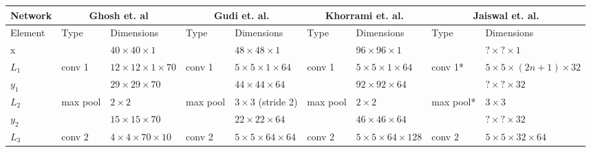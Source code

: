 \documentclass[9pt]{article} \usepackage{amsmath, amsthm, amssymb}
\begin{document}
\begin{table}[h!]
\centering
{\footnotesize
\begin{tabular}{|lllllllll|}
\hline
Network                      & \multicolumn{2}{c}{Ghosh et. al\cite{Ghosh2015}}                         & \multicolumn{2}{c}{Gudi et. al.\cite{Gudi2015}}                            & \multicolumn{2}{c}{Khorrami et. al.\cite{dodeeplearn}}                          & \multicolumn{2}{c|}{Jaiswal et. al.\cite{Jaiswal2016}}   \\ \hline
\multicolumn{1}{|l|}{Element} & Type     & \multicolumn{1}{l|}{Dimensions}                    & Type     & \multicolumn{1}{l|}{Dimensions}                      & Type          & \multicolumn{1}{l|}{Dimensions}                  & Type      & Dimensions                     \\ \hline
\multicolumn{1}{|l|}{x}       &          & \multicolumn{1}{l|}{$40\times40\times1$}           &          & \multicolumn{1}{l|}{$48\times 48\times1$}            &               & \multicolumn{1}{l|}{$96\times96\times1$}         &           & $?\times?\times1$              \\ \hline
\multicolumn{1}{|l|}{$L_1$}   & conv 1   & \multicolumn{1}{l|}{$12\times 12\times1\times 70$} & conv 1   & \multicolumn{1}{l|}{$5\times 5\times1\times64$}      & conv 1        & \multicolumn{1}{l|}{$5\times5\times1\times64$}   & conv 1*   & $5\times5\times(2n+1)\times32$ \\
\multicolumn{1}{|l|}{$y_1$}   &          & \multicolumn{1}{l|}{$29\times29\times70$}          &          & \multicolumn{1}{l|}{$44\times44\times64$}            &               & \multicolumn{1}{l|}{$92\times92\times64$}        &           & $?\times?\times32$             \\ \hline
\multicolumn{1}{|l|}{$L_2$}   & max pool & \multicolumn{1}{l|}{$2\times 2$}                   & max pool & \multicolumn{1}{l|}{$3\times3$ (stride 2)}           & max pool      & \multicolumn{1}{l|}{$2\times2$}                  & max pool*  & $3\times3$                    \\
\multicolumn{1}{|l|}{$y_2$}   &          & \multicolumn{1}{l|}{$15\times15\times 70$}         &          & \multicolumn{1}{l|}{$22\times 22\times64$}           &               & \multicolumn{1}{l|}{$46\times46\times64$}        &           & $?\times?\times32$             \\ \hline
\multicolumn{1}{|l|}{$L_3$}   & conv 2   & \multicolumn{1}{l|}{$4\times 4\times70\times 10$}  & conv 2   & \multicolumn{1}{l|}{$5 \times 5 \times 64\times64$}  & conv 2        & \multicolumn{1}{l|}{$5\times5\times64\times128$} & conv 2    & $5\times5\times32\times64$     \\

\end{tabular}}
\end{table}
\end{document}
